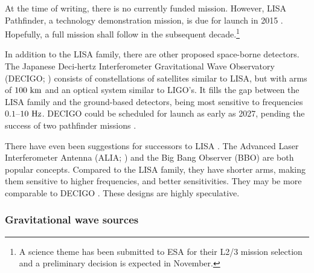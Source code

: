 At the time of writing, there is no currently funded mission. However, LISA Pathfinder, a technology demonstration mission, is due for launch in 2015 \citep{Anza2005, Antonucci2012}. Hopefully, a full mission shall follow in the subsequent decade.\footnote{A science theme has been submitted to ESA for their L2/3 mission selection and a preliminary decision is expected in November.}

In addition to the LISA family, there are other proposed space-borne detectors. The Japanese Deci-hertz Interferometer Gravitational Wave Observatory (DECIGO; \citealt{Kawamura2006,Kawamura2011}) consists of constellations of satellites similar to LISA, but with arms of $100~\mathrm{km}$ and an optical system similar to LIGO's. It fills the gap between the LISA family and the ground-based detectors, being most sensitive to frequencies $0.1$--$10~\mathrm{Hz}$. DECIGO could be scheduled for launch as early as 2027, pending the success of two pathfinder missions \citep{Ando2010}.

There have even been suggestions for successors to LISA \citep{Crowder2005}. The Advanced Laser Interferometer Antenna (ALIA; \citealt{Bender2013}) and the Big Bang Observer (BBO) are both popular concepts. Compared to the LISA family, they have shorter arms, making them sensitive to higher frequencies, and better sensitivities. They may be more comparable to DECIGO \citep{Yagi2011a}. These designs are highly speculative.

\subsubsection{Gravitational wave sources}\label{sec:GW-sources}

